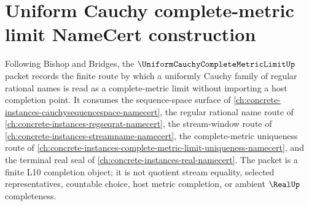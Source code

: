 \chapter{Uniform Cauchy complete-metric limit NameCert construction}
\label{ch:concrete-instances-uniform-cauchy-complete-metric-limit-namecert}

Following Bishop and Bridges, the $\UniformCauchyCompleteMetricLimitUp$ packet records the finite route by which a uniformly Cauchy family of regular rational names is read as a complete-metric limit without importing a host completion point. It consumes the sequence-space surface of \autoref{ch:concrete-instances-cauchysequencespace-namecert}, the regular rational name route of \autoref{ch:concrete-instances-regseqrat-namecert}, the stream-window route of \autoref{ch:concrete-instances-streamname-namecert}, the complete-metric uniqueness route of \autoref{ch:concrete-instances-complete-metric-limit-uniqueness-namecert}, and the terminal real seal of \autoref{ch:concrete-instances-real-namecert}. The packet is a finite L10 completion object; it is not quotient stream equality, selected representatives, countable choice, host metric completion, or ambient $\RealUp$ completeness.

